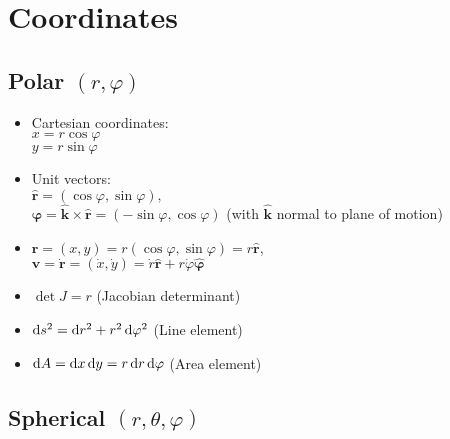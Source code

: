 \documentclass[a4paper, 11pt]{scrartcl}
\renewcommand{\vec}[1]{\bm{#1}}
\newcommand{\uvec}[1]{\hat{\vec{#1}}}
\begin{document}
\section*{Coordinates}

\subsection*{Polar $(r, \varphi)$}

\begin{itemize}
  \item Cartesian coordinates:\\
        $x = r \cos \varphi$\\
        $y = r \sin \varphi$
  \item Unit vectors:\\
        $\uvec{r} = (\cos \varphi, \sin \varphi),$\\
        $\uvec{\varphi} = \uvec{k} \times \uvec{r} = (-\sin \varphi, \cos \varphi)$ \quad (with $\uvec{k}$ normal to plane of motion)
  \item $\vec{r} = (x, y) = r(\cos{\varphi}, \sin \varphi) = r\uvec{r}$,\\
        $\vec{v} = \vec{\dot{r}} = (\dot{x}, \dot{y}) = \dot{r}\uvec{r} + r \dot{\varphi} \uvec{\varphi}$
  \item $\det J = r$ \quad (Jacobian determinant)
  \item $\dif s^2 = \dif r^2+r^2\dif \varphi^2$ \quad (Line element)
  \item $\dif A = \dif x \dif y = r\dif r \dif \varphi$ \quad (Area element)
\end{itemize}

\subsection*{Spherical $(r, \theta, \varphi)$}
\end{document}
